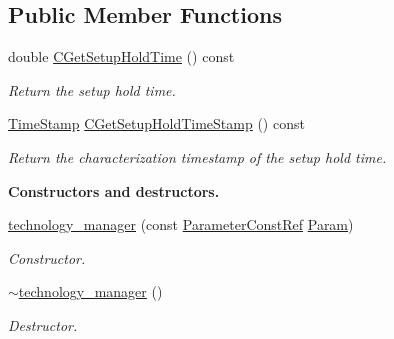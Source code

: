 \subsection*{Public Member Functions}
\begin{DoxyCompactItemize}
\item 
double \hyperlink{classtechnology__manager_ab25d130e2a4fe506fcb50d5c0f46d8bd}{C\+Get\+Setup\+Hold\+Time} () const
\begin{DoxyCompactList}\small\item\em Return the setup hold time. \end{DoxyCompactList}\item 
\hyperlink{structTimeStamp}{Time\+Stamp} \hyperlink{classtechnology__manager_a4e1d25b7ad4c37cae201f371a7c4a9a1}{C\+Get\+Setup\+Hold\+Time\+Stamp} () const
\begin{DoxyCompactList}\small\item\em Return the characterization timestamp of the setup hold time. \end{DoxyCompactList}\end{DoxyCompactItemize}
\begin{Indent}\textbf{ Constructors and destructors.}\par
\begin{DoxyCompactItemize}
\item 
\hyperlink{classtechnology__manager_aca933b39a83c4a9638a79ad19f8b9ff5}{technology\+\_\+manager} (const \hyperlink{Parameter_8hpp_a37841774a6fcb479b597fdf8955eb4ea}{Parameter\+Const\+Ref} \hyperlink{classtechnology__manager_a47edc9b47d477c53cde3442aa27dab05}{Param})
\begin{DoxyCompactList}\small\item\em Constructor. \end{DoxyCompactList}\item 
\hyperlink{classtechnology__manager_a6b6006913417ce77e17560eae5dc7813}{$\sim$technology\+\_\+manager} ()
\begin{DoxyCompactList}\small\item\em Destructor. \end{DoxyCompactList}\end{DoxyCompactItemize}
\end{Indent}
